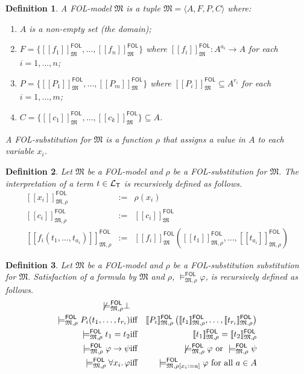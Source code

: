 \documentclass{article}
\newtheorem{definition}{Definition}[section]
\newcommand{\FOL}{\textsf{FOL}}
\newcommand{\lang}[1]{\ensuremath{{\cal L}_{\mathsf{#1}}}}
\newcommand{\intm}[3]{\ensuremath{[\![{#3}]\!]^{\mathsf{#1}}_{\mathfrak{#2}}}}
\newcommand{\ints}[4]{\ensuremath{[\![{#4}]\!]^{\mathsf{#1}}_{\mathfrak{#2},{#3}}}}
\newcommand{\mymodelss}[3]{\ensuremath{\models_{\mathfrak{#2},{#3}}^{\mathsf{#1}}}}
\def\sep{.\,}
\begin{document}
\begin{definition}\label{defn:FOLmodel} A {\FOL}-model $\mathfrak M$
is a tuple $\mathfrak M=\langle A,F,P,C\rangle$ where:
\begin{enumerate}[--]
\item $A$ is a non-empty set (the domain);
\item $F=\{\intm{FOL}M{f_1},\ldots,\intm{FOL}M{f_n}\}$ where
$\intm{FOL}M{f_i}:A^{a_i}\to A$ for each $i=1,\ldots,n$;
\item $P=\{\intm{FOL}M{P_1},\ldots,\intm{FOL}M{P_m}\}$ where
$\intm{FOL}M{P_i}\subseteq A^{r_i}$ for each $i=1,\ldots,m$;
\item $C=\{\intm{FOL}M{c_1},\ldots,\intm{FOL}M{c_k}\}\subseteq A$.
\end{enumerate}
A {\FOL}-substitution for $\mathfrak M$ is a function $\rho$ that assigns
a value in $A$ to each variable $x_i$.
\end{definition}

\begin{definition}\label{defn:FOLinterpretation}
Let $\mathfrak M$ be a {\FOL}-model and $\rho$ be a {\FOL}-substitution for
$\mathfrak M$.  The interpretation of a term $t\in\lang T$ is
recursively defined as follows.
\begin{eqnarray*}
\ints{FOL}M\rho{x_i} & := & \rho(x_i) \\
\ints{FOL}M\rho{c_i} & := & \intm{FOL}M{c_i} \\
\ints{FOL}M\rho{f_i(t_1,\ldots,t_{a_i})} & := & \intm{FOL}M{f_i}
  \left(\ints{FOL}M\rho{t_1},\ldots,\ints{FOL}M\rho{t_{a_i}}\right)
\end{eqnarray*}
\end{definition}

\begin{definition}\label{defn:FOLsatisfaction}
Let $\mathfrak M$ be a {\FOL}-model and $\rho$ be a {\FOL}-substitution
substitution for $\mathfrak M$.  Satisfaction of a formula by $\mathfrak M$
and $\rho$, $\mymodelss{FOL}M\rho\varphi$, is recursively defined as follows.
\begin{eqnarray*}
\not\!{\mymodelss{FOL}M\rho}\bot \\
\mymodelss{FOL}M\rho P_i(t_1,\ldots,t_{r_i}) & \mbox{iff} &
 \ints{FOL}M\rho{P_i}\left(
   \ints{FOL}M\rho{t_1},\ldots,\ints{FOL}M\rho{t_{r_i}}\right) \\
\mymodelss{FOL}M\rho t_1=t_2 & \mbox{iff} &
 \ints{FOL}M\rho{t_1}=\ints{FOL}M\rho{t_2} \\
\mymodelss{FOL}M\rho\varphi\to\psi & \mbox{iff} &
 \not\!{\mymodelss{FOL}M\rho\varphi} \mbox{ or } \mymodelss{FOL}M\rho\psi \\
\mymodelss{FOL}M\rho\forall x_i\sep\varphi & \mbox{iff} &
 \mymodelss{FOL}M{\rho[x_i:=a]}\varphi\mbox{ for all $a\in A$}
\end{eqnarray*}
\end{definition}
\end{document}
